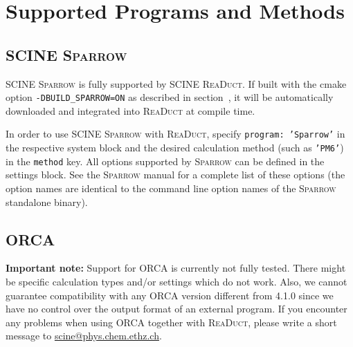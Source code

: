 \documentclass[]{tufte-book}
\begin{document}
\section{Supported Programs and Methods}

\subsection{SCINE \textsc{Sparrow}}

SCINE \textsc{Sparrow} is fully supported by SCINE \textsc{ReaDuct}. If built with the cmake option \texttt{-DBUILD\_SPARROW=ON}
as described in section~, it will be automatically downloaded and integrated into \textsc{ReaDuct}
at compile time.

In order to use SCINE \textsc{Sparrow} with \textsc{ReaDuct}, specify \texttt{program: 'Sparrow'} in the respective system
block and the desired calculation method (such as \texttt{'PM6'}) in the \texttt{method} key. All options supported by \textsc{Sparrow} 
can be defined in the settings block. See the \textsc{Sparrow} manual for a complete list of these options (the option 
names are identical to the command line option names of the \textsc{Sparrow} standalone binary).

\subsection{ORCA}

\textbf{Important note:} Support for ORCA\cite{orca} is currently not fully tested. There might be specific calculation
types and/or settings which do not work. Also, we cannot guarantee compatibility with any ORCA version different from
4.1.0 since we have no control over the output format of an external program. If you encounter any problems when
using ORCA together with \textsc{ReaDuct}, please write a short message to \href{scine@phys.chem.ethz.ch}{scine@phys.chem.ethz.ch}.
\end{document}
